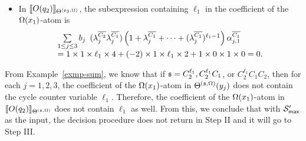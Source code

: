 \begin{example}
\begin{itemize}
\[\begin{array}{l}
\end{array}
\]
%
\item In $\llbracket O(q_2)\rrbracket_{\Theta^{({\mathfrak{s} }_3, \Omega)}}$, the subexpression containing $\ell_1$ in the coefficient of the $\Omega(x_1)$-atom is 
\[
\begin{array}{l}
\sum \limits_{1 \le j \le 3} b_j
\begin{array}{l}
 (\lambda^{\overline{C_{2}}}_{j}\lambda^{\overline{C_{1}}}_{j})
\left(1+\lambda^{\overline{C_{1}}}_{j} + \dots + (\lambda^{\overline{C_{1}}}_{j})^{\ell_1-1} \right) \alpha^{\overline{C_{1}}}_{j, 1}
\end{array}
\\
= 1 \times 1 \times \ell_1 \times 4 + (-2) \times 1 \times \ell_1 \times 2 + 1 \times 0 \times 1 \times 0 =0.
\end{array}
\]
\end{itemize}
From Example~\ref{exmp-sum}, we know that if ${\mathfrak{s} }=C^{\ell_1}_2, C^{\ell_1}_2 C_1$, or $C^{\ell_1}_2 C_1 C_2$, then for each $j =1, 2,3$, the coefficient of the $\Omega(x_1)$-atom in $\Theta^{({\mathfrak{s} }, \Omega)}(y_j)$ does not contain the cycle counter variable $\ell_1$. Therefore, the coefficient of the $\Omega(x_1)$-atom in $\llbracket O(q_2)\rrbracket_{\Theta^{({\mathfrak{s} }, \Omega)}}$ does not contain $\ell_1$ as well. From this, we conclude that with ${\mathcal{S} }'_{\sf max}$ as the input, the decision procedure does not return in Step II and it will go to Step III.
\end{example}


